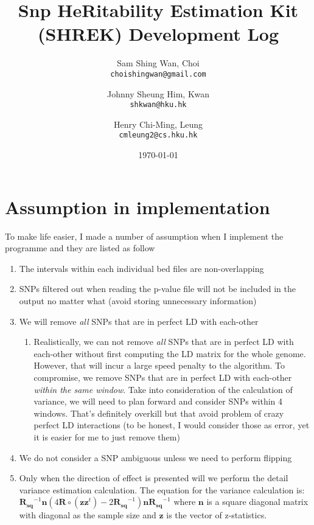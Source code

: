 \documentclass[12pt]{article}
\title{Snp HeRitability Estimation Kit (SHREK) Development Log}
\date{\today}
\author{Sam Shing Wan, Choi\\ 
	\texttt{choishingwan@gmail.com}
	\and
	Johnny Sheung Him, Kwan\\
	\texttt{shkwan@hku.hk}
	\and
	Henry Chi-Ming, Leung\\
	\texttt{cmleung2@cs.hku.hk}
}
\begin{document}
	
	\maketitle
	\tableofcontents
	\newpage
	\section{Assumption in implementation}
	To make life easier, I made a number of assumption when I implement the programme and they are listed as follow
	\begin{enumerate}
		\item The intervals within each individual bed files are non-overlapping
		\item SNPs filtered out when reading the p-value file will not be included in the output no matter what (avoid storing unnecessary information)
		\item We will remove \emph{all} SNPs that are in perfect LD with each-other
		\begin{enumerate}
			\item Realistically, we can not remove \emph{all} SNPs that are in perfect LD with each-other without first computing the LD matrix for the whole genome. 
			However, that will incur a large speed penalty to the algorithm.
			To compromise, we remove SNPs that are in perfect LD with each-other \emph{within the same window}.
			Take into consideration of the calculation of variance, we will need to plan forward and consider SNPs within 4 windows. 
			That's definitely overkill but that avoid problem of crazy perfect LD interactions (to be honest, I would consider those as error, yet it is easier for me to just remove them)
		\end{enumerate}
		\item We do not consider a SNP ambiguous unless we need to perform flipping
		\item Only when the direction of effect is presented will we perform the detail variance estimation calculation.
		The equation for the variance calculation is:
		\begin{math}
			\boldsymbol{R_{sq}}^{-1}\boldsymbol{n}(4\boldsymbol{R}\circ(\boldsymbol{zz}^t)-2\boldsymbol{R_{sq}}^{-1})\boldsymbol{n}\boldsymbol{R_{sq}}^{-1}
		\end{math}
		where $\boldsymbol{n}$ is a square diagonal matrix with diagonal as the sample size and $\boldsymbol{z}$ is the vector of z-statistics.
	\end{enumerate}
	
\end{document}
